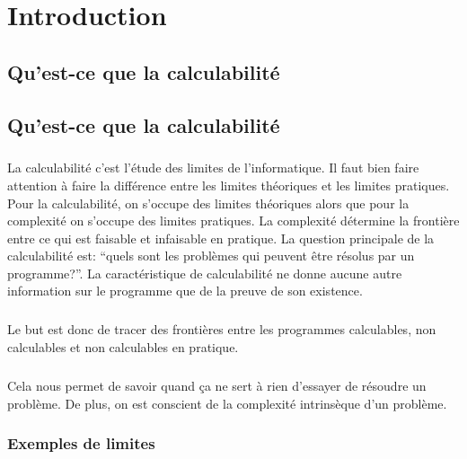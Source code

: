 
\chapter{Introduction}
\label{ch:introduction}

\section{Qu'est-ce que la calculabilité}
\label{sec:qu_est-ce_la_calculabilite}

\section{Qu'est-ce que la calculabilité}
\paragraph{}

La calculabilité c'est l'étude des limites de l'informatique. Il faut bien
faire attention à faire la différence entre les limites théoriques et les limites
pratiques. Pour la calculabilité, on s'occupe des limites théoriques alors que pour 
la complexité on s'occupe des limites pratiques. La complexité
détermine la frontière entre ce qui est faisable et infaisable en pratique.
La question principale de la calculabilité est: ``quels sont les problèmes qui peuvent
être résolus par un programme?''. La caractéristique de calculabilité ne donne aucune 
autre information sur le programme que de la preuve de son existence.

\paragraph{} Le but est donc de tracer des frontières entre les programmes calculables,
non calculables et non calculables en pratique.

\paragraph{}
Cela nous permet de savoir quand ça ne sert à rien d'essayer de résoudre un problème.
De plus, on est conscient de la complexité intrinsèque d'un problème.

\subsection{Exemples de limites}
\label{subsec:exemples_limites}

